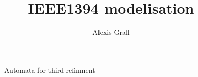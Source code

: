 \documentclass[10pt, a4paper]{article}
\title{IEEE1394 modelisation}
\author{Alexis Grall }
\begin{document}
\maketitle
%
%
%

%

\begin{figure}
    \centering
        
    \caption{Automata for third refinment}
    \label{fig:my_label}
\end{figure}
\end{document}
